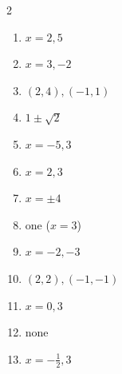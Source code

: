 \documentclass[11pt]{article}
\begin{document}
\begin{keybox}
\begin{multicols}{2}
\small
\begin{enumerate}[leftmargin=*,itemsep=3pt]
  \item $x=2,5$
  \item $x=3,-2$
  \item $(2,4),(-1,1)$
  \item $1\pm\sqrt2$
  \item $x=-5,3$
  \item $x=2,3$
  \item $x=\pm4$
  \item one ($x=3$)
  \item $x=-2,-3$
  \item $(2,2),(-1,-1)$
  \item $x=0,3$
  \item none
  \item $x=-\tfrac12,3$
\end{enumerate}
\end{multicols}
\end{keybox}
\end{document}
